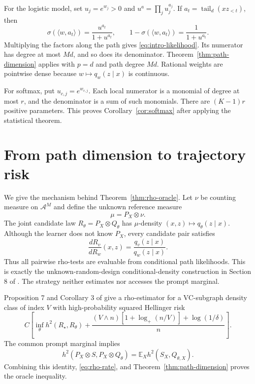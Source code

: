 \documentclass{article}
\theoremstyle{definition}
\theoremstyle{remark}
\newcommand{\E}{\mathbb E}
\newcommand{\cA}{\mathcal A}
\newcommand{\tail}{\operatorname{tail}}
\begin{document}
For the logistic model, set $u_j=e^{w_j}>0$ and $u^a=\prod_j u_j^{a_j}$. If $a_t=\tail_d(xz_{<t})$, then \[ \sigma(\langle w,a_t\rangle)=\frac{u^{a_t}}{1+u^{a_t}}, \qquad 1-\sigma(\langle w,a_t\rangle)=\frac{1}{1+u^{a_t}}. \] Multiplying the factors along the path gives \eqref{eq:intro-likelihood}. Its numerator has degree at most $Md$, and so does its denominator. Theorem~\ref{thm:path-dimension} applies with $p=d$ and path degree $Md$. Rational weights are pointwise dense because $w\mapsto q_w(z\mid x)$ is continuous.

For softmax, put $u_{c,j}=e^{w_{c,j}}$. Each local numerator is a monomial of degree at most $r$, and the denominator is a sum of such monomials. There are $(K-1)r$ positive parameters. This proves Corollary~\ref{cor:softmax} after applying the statistical theorem.

\section{From path dimension to trajectory risk}
\label{sec:rho-proof}

We give the mechanism behind Theorem~\ref{thm:rho-oracle}. Let $\nu$ be counting measure on $\cA^M$ and define the unknown reference measure \[ \mu=P_X\otimes\nu. \] The joint candidate law $R_\theta=P_X\otimes Q_\theta$ has $\mu$-density $(x,z)\mapsto q_\theta(z\mid x)$. Although the learner does not know $P_X$, every candidate pair satisfies
\begin{equation}
\label{eq:marginal-cancel}
\frac{dR_v}{dR_w}(x,z)=\frac{q_v(z\mid x)}{q_w(z\mid x)}.
\end{equation}
Thus all pairwise rho-tests are evaluable from conditional path likelihoods. This is exactly the unknown-random-design conditional-density construction in Section 8 of \citet{baraud2018rho}. The strategy neither estimates nor accesses the prompt marginal.

Proposition 7 and Corollary 3 of \citet{baraud2018rho} give a rho-estimator for a VC-subgraph density class of index $V$ with high-probability squared Hellinger risk
\begin{equation}
\label{eq:rho-rate}
C\left[\inf_{\theta}h^2(R_\star,R_\theta)+\frac{(V\wedge n)[1+\log_+(n/V)]+\log(1/\delta)}{n}\right].
\end{equation}
The common prompt marginal implies \[ h^2(P_X\otimes S,P_X\otimes Q_\theta) =\E_Xh^2(S_X,Q_{\theta,X}). \] Combining this identity, \eqref{eq:rho-rate}, and Theorem~\ref{thm:path-dimension} proves the oracle inequality.
\end{document}
